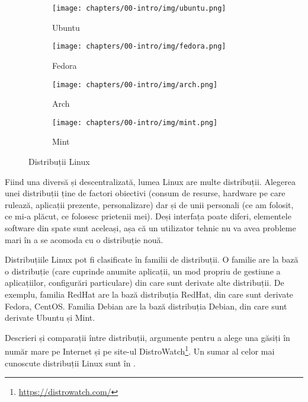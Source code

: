 \begin{figure}[htbp]
  \centering
  \begin{subfigure}[b]{0.6\textwidth}
    \texttt{[image: chapters/00-intro/img/ubuntu.png]}
    \caption{Ubuntu}
    \label{fig:intro:distro:ubuntu}
  \end{subfigure}

  \begin{subfigure}[b]{0.6\textwidth}
    \texttt{[image: chapters/00-intro/img/fedora.png]}
    \caption{Fedora}
    \label{fig:intro:distro:fedora}
  \end{subfigure}

  \begin{subfigure}[b]{0.6\textwidth}
    \texttt{[image: chapters/00-intro/img/arch.png]}
    \caption{Arch}
    \label{fig:intro:distro:arch}
  \end{subfigure}

  \begin{subfigure}[b]{0.6\textwidth}
    \texttt{[image: chapters/00-intro/img/mint.png]}
    \caption{Mint}
    \label{fig:intro:distro:mint}
  \end{subfigure}
  \caption{Distribuții Linux}
  \label{fig:intro:distros}
\end{figure}

Fiind una diversă și descentralizată, lumea Linux are multe distribuții. Alegerea unei distribuții ține de factori obiectivi (consum de resurse, hardware pe care rulează, aplicații prezente, personalizare) dar și de unii personali (ce am folosit, ce mi-a plăcut, ce folosesc prietenii mei). Deși interfața poate diferi, elementele software din spate sunt aceleași, așa că un utilizator tehnic nu va avea probleme mari în a se acomoda cu o distribuție nouă.

Distribuțiile Linux pot fi clasificate în familii de distribuții. O familie are la bază o distribuție (care cuprinde anumite aplicații, un mod propriu de gestiune a aplicațiilor, configurări particulare) din care sunt derivate alte distribuții. De exemplu, familia RedHat are la bază distribuția RedHat, din care sunt derivate Fedora, CentOS. Familia Debian are la bază distribuția Debian, din care sunt derivate Ubuntu și Mint.

Descrieri și comparații între distribuții, argumente pentru a alege una găsiți în număr mare pe Internet și pe site-ul DistroWatch\footnote{\url{https://distrowatch.com/}}. Un sumar al celor mai cunoscute distribuții Linux sunt în .

